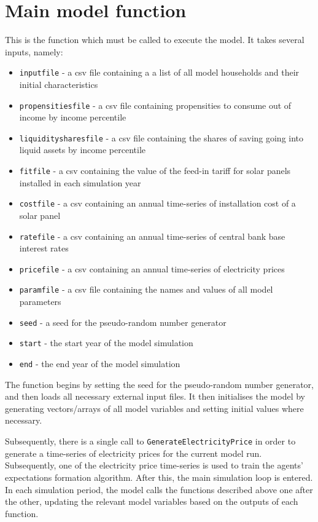 \documentclass[
  letterpaper,
  DIV=11,
  numbers=noendperiod]{scrartcl}
\providecommand{\tightlist}{%
  \setlength{\itemsep}{0pt}\setlength{\parskip}{0pt}}\usepackage{longtable,booktabs,array}
\begin{document}
\hypertarget{main-model-function}{%
\section{Main model function}\label{main-model-function}}

This is the function which must be called to execute the model. It takes
several inputs, namely:

\begin{itemize}
\tightlist
\item
  \texttt{inputfile} - a csv file containing a a list of all model
  households and their initial characteristics
\item
  \texttt{propensitiesfile} - a csv file containing propensities to
  consume out of income by income percentile
\item
  \texttt{liquiditysharesfile} - a csv file containing the shares of
  saving going into liquid assets by income percentile
\item
  \texttt{fitfile} - a csv containing the value of the feed-in tariff
  for solar panels installed in each simulation year
\item
  \texttt{costfile} - a csv containing an annual time-series of
  installation cost of a solar panel
\item
  \texttt{ratefile} - a csv containing an annual time-series of central
  bank base interest rates
\item
  \texttt{pricefile} - a csv containing an annual time-series of
  electricity prices
\item
  \texttt{paramfile} - a csv file containing the names and values of all
  model parameters
\item
  \texttt{seed} - a seed for the pseudo-random number generator
\item
  \texttt{start} - the start year of the model simulation
\item
  \texttt{end} - the end year of the model simulation
\end{itemize}

The function begins by setting the seed for the pseudo-random number
generator, and then loads all necessary external input files. It then
initialises the model by generating vectors/arrays of all model
variables and setting initial values where necessary.

Subsequently, there is a single call to
\texttt{GenerateElectricityPrice} in order to generate a time-series of
electricity prices for the current model run. Subsequently, one of the
electricity price time-series is used to train the agents' expectations
formation algorithm. After this, the main simulation loop is entered. In
each simulation period, the model calls the functions described above
one after the other, updating the relevant model variables based on the
outputs of each function.
\end{document}
